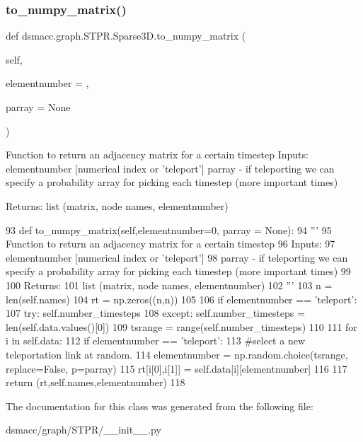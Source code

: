\subsubsection{\texorpdfstring{to\+\_\+numpy\+\_\+matrix()}{to\_numpy\_matrix()}}
{\footnotesize\ttfamily def dsmacc.\+graph.\+S\+T\+P\+R.\+Sparse3\+D.\+to\+\_\+numpy\+\_\+matrix (\begin{DoxyParamCaption}\item[{}]{self,  }\item[{}]{elementnumber = {},  }\item[{}]{parray = {\ttfamily None} }\end{DoxyParamCaption})}

\begin{DoxyVerb}Function to return an adjacency matrix for a certain timestep 
Inputs:
    elementnumber [numerical index or 'teleport']
    parray - if teleporting we can specify a probability array for picking each timestep (more important times)
    
Returns: 
   list (matrix, node names, elementnumber)
\end{DoxyVerb}
 
\begin{DoxyCode}
93       \textcolor{keyword}{def }to\_numpy\_matrix(self,elementnumber=0, parray = None): 
94           \textcolor{stringliteral}{''' }
95 \textcolor{stringliteral}{          Function to return an adjacency matrix for a certain timestep }
96 \textcolor{stringliteral}{          Inputs:}
97 \textcolor{stringliteral}{              elementnumber [numerical index or 'teleport']}
98 \textcolor{stringliteral}{              parray - if teleporting we can specify a probability array for picking each timestep (more
       important times)}
99 \textcolor{stringliteral}{              }
100 \textcolor{stringliteral}{          Returns: }
101 \textcolor{stringliteral}{             list (matrix, node names, elementnumber)}
102 \textcolor{stringliteral}{          '''}
103           n = len(self.names)
104           rt = np.zeros((n,n))
105           
106           \textcolor{keywordflow}{if} elementnumber == \textcolor{stringliteral}{'teleport'}:
107                 \textcolor{keywordflow}{try}: self.number\_timesteps
108                 \textcolor{keywordflow}{except}: self.number\_timesteps = len(self.data.values()[0])
109                 tsrange = range(self.number\_timesteps)
110                         
111           \textcolor{keywordflow}{for} i \textcolor{keywordflow}{in} self.data:
112               \textcolor{keywordflow}{if} elementnumber == \textcolor{stringliteral}{'teleport'}:
113                   \textcolor{comment}{#select a new teleportation link at random. }
114                   elementnumber = np.random.choice(tsrange, replace=\textcolor{keyword}{False}, p=parray)
115               rt[i[0],i[1]] = self.data[i][elementnumber]
116               
117           \textcolor{keywordflow}{return} (rt,self.names,elementnumber)
118             
\end{DoxyCode}


The documentation for this class was generated from the following file\+:\begin{DoxyCompactItemize}
\item 
dsmacc/graph/\+S\+T\+P\+R/\+\_\+\+\_\+init\+\_\+\+\_\+.\+py\end{DoxyCompactItemize}
